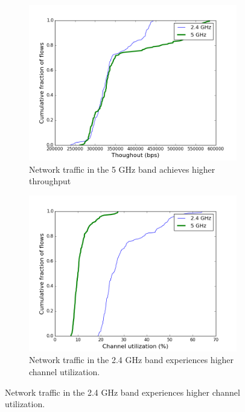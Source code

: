 \begin{figure}
\begin{subfigure}{0.5\textwidth}
\includegraphics[width=\linewidth]{figure/throughput(5g_vs_2g).png}
\caption{Network traffic in the 5 GHz band achieves higher throughput} 
\label{fig:throughput}
\end{subfigure}
\hspace*{\fill} %
\begin{subfigure}{0.5\textwidth}
\includegraphics[width=\linewidth]{figure/channel_utilization(2g_vs_5g).png}
\caption{Network traffic in the 2.4 GHz band experiences higher channel utilization.} 
\label{fig:utilization}
\end{subfigure}

\end{figure}
